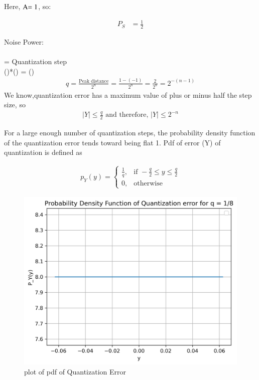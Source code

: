 \documentclass[journal,12pt,onecolumn]{IEEEtran}
\begin{document}
Here, \($A$ = 1\), so:

\begin{align}
P_S &= \frac{1}{2}
\end{align}
\item Noise Power:\\
\\
 = Quantization step \\
()*() =    ()\\
\begin{align}
q = \frac{\text{Peak distance}}{2^{n}} = \frac{1-(-1)}{2^{n}} = \frac{2}{2^{n}} = 2^{-(n-1)} \label{eq:gate:1}
\end{align}
\label{fig:Gate.31.2023.1}
We know,quantization error has a maximum value of plus or minus half the
step size, so 
\begin{align}
\left| Y \right| \leq \frac{q}{2} \text{ and therefore, } \left| Y \right| \leq 2^{-n}
\end{align}

For a large enough number of quantization steps, the probability density function of the quantization error tends toward being flat 1.
Pdf of error (Y) of quantization is defined as 

\begin{align}
p_Y(y) = 
\begin{cases}
    \frac{1}{q}, & \text{if } -\frac{q}{2} \leq y \leq \frac{q}{2} \\
    0, & \text{otherwise}
\end{cases}
\end{align}
\begin{figure}[H]
  \centering
  \includegraphics[width=0.7\columnwidth]{2023/EC/31/Graph/b.png}
  \caption{plot of pdf of Quantization Error}
  \label{fig:Gate.31.2023.2}
\end{figure}
\end{document}
